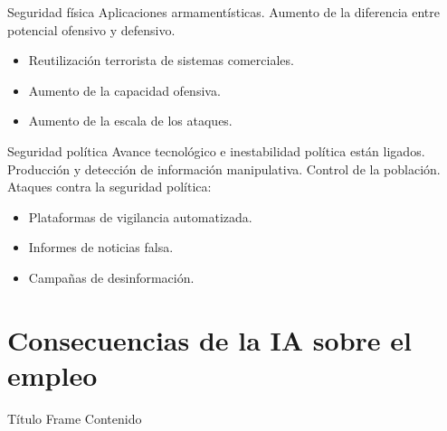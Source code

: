 \documentclass{beamer}
\begin{document}
\begin{frame}{Seguridad física}
Aplicaciones armamentísticas.
\newline
\newline
Aumento de la diferencia entre potencial ofensivo y defensivo.
\newline
\newline
\begin{itemize}
\item Reutilización terrorista de sistemas comerciales.
\item Aumento de la capacidad ofensiva.
\item Aumento de la escala de los ataques.
\end{itemize}
\end{frame}

\begin{frame}{Seguridad política}
Avance tecnológico e inestabilidad política están ligados.
\newline
\newline
Producción y detección de información manipulativa.
\newline
\newline
Control de la población.
\newline
\newline
Ataques contra la seguridad política:
\begin{itemize}
\item Plataformas de vigilancia automatizada.
\item Informes de noticias falsa.
\item Campañas de desinformación.
\end{itemize}
\end{frame}

\section{Consecuencias de la IA sobre el empleo}
\begin{frame}{Título Frame}
Contenido
\end{frame}
\end{document}
